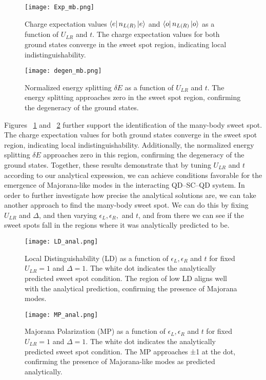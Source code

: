 \documentclass[11pt, letterpaper, titlepage]{article}
\begin{document}
\newpage 
\begin{figure}
  \centering
  \texttt{[image: Exp\_mb.png]}
  \caption{Charge expectation values $\bra{e}n_{L(R)}\ket{e}$ and $\bra{o}n_{L(R)}\ket{o}$ as a function of $U_{LR}$ and $t$. The charge expectation values for both ground states converge in the sweet spot region, indicating local indistinguishability.}
  \label{fig:mb_charge}
\end{figure}
\begin{figure}
  \centering
  \texttt{[image: degen\_mb.png]}
  \caption{Normalized energy splitting $\delta E$ as a function of $U_{LR}$ and $t$. The energy splitting approaches zero in the sweet spot region, confirming the degeneracy of the ground states.}
  \label{fig:mb_deltaE}
\end{figure}
Figures ~\ref{fig:mb_charge} and ~\ref{fig:mb_deltaE} further support the identification of the many-body sweet spot. The charge expectation values for both ground states converge in the sweet spot region, indicating local indistinguishability. Additionally, the normalized energy splitting $\delta E$ approaches zero in this region, confirming the degeneracy of the ground states. Together, these results demonstrate that by tuning $U_{LR}$ and $t$ according to our analytical expression, we can achieve conditions favorable for the emergence of Majorana-like modes in the interacting QD–SC–QD system.
\newpage
In order to further investigate how precise the analytical solutions are, we can take another approach to find the many-body sweet spot. We can do this by fixing $U_{LR}$ and $Δ$, and then varying $ϵ_L, ϵ_R,$ and $t$, and from there we can see if the sweet spots fall in the regions where it was analytically predicted to be.\\
\begin{figure}[htbp]
  \centering
  \texttt{[image: LD\_anal.png]}
  \caption{Local Distinguishability (LD) as a function of $ϵ_L,ϵ_R$ and $t$ for fixed $U_{LR} = 1$ and $Δ = 1$. The white dot indicates the analytically predicted sweet spot condition. The region of low LD aligns well with the analytical prediction, confirming the presence of Majorana modes.}
  \label{fig:mb_LD_anal}
\end{figure}
\begin{figure}[htbp]
  \centering
  \texttt{[image: MP\_anal.png]}
  \caption{Majorana Polarization (MP) as a function of $ϵ_L,ϵ_R$ and $t$ for fixed $U_{LR} = 1$ and $Δ = 1$. The white dot indicates the analytically predicted sweet spot condition. The MP approaches ±1 at the dot, confirming the presence of Majorana-like modes as predicted analytically.}
  \label{fig:mb_MP_anal}
\end{figure}
\end{document}
